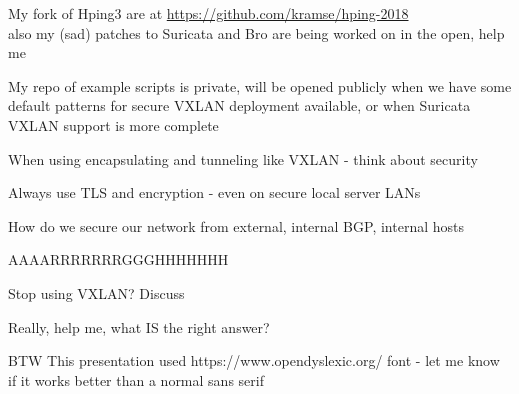 \documentclass[16pt,landscape,a4paper,footrule]{foils}
\begin{document}
My fork of Hping3 are at \url{https://github.com/kramse/hping-2018}\\
also my (sad) patches to Suricata and Bro are being worked on in the open, help me

My repo of example scripts is private, will be opened publicly when we have some default patterns for secure VXLAN deployment available, or when Suricata VXLAN support is more complete



\begin{list2}
\item When using encapsulating and tunneling like VXLAN - think about security
\item Always use TLS and encryption - even on secure local server LANs
\item How do we secure our network from external, internal BGP, internal hosts
\item AAAARRRRRRRGGGHHHHHHH \smiley
\item Stop using VXLAN? Discuss
\end{list2}

\vskip 2cm
Really, help me, what IS the right answer? \smiley

\vskip 2cm
BTW This presentation used https://www.opendyslexic.org/ font - let me know if it works better than a normal sans serif
\end{document}

